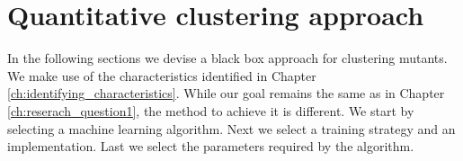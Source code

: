 \documentclass[../main]{subfiles}
\begin{document}
\chapter{Quantitative clustering approach}
\label{ch:reserach_question2}
In the following sections we devise a black box approach for clustering mutants.
We make use of the characteristics identified in Chapter \ref{ch:identifying_characteristics}.
While our goal remains the same as in Chapter \ref{ch:reserach_question1}, the method to achieve it is different.
\newline
We start by selecting a machine learning algorithm.
Next we select a training strategy and an implementation.
Last we select the parameters required by the algorithm.


\end{document}
